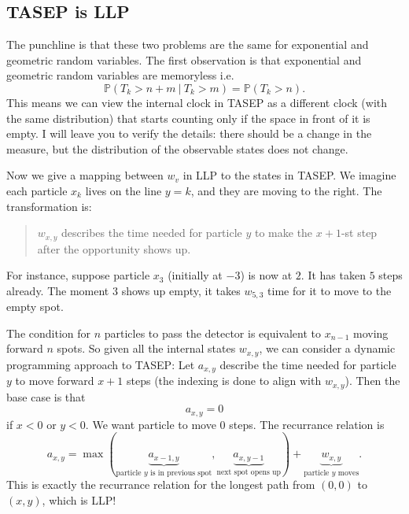 \subsection*{TASEP is LLP}
The punchline is that these two problems are the same for exponential and geometric random variables. The first observation is that exponential and geometric random variables are memoryless i.e. \[
\mathbb{P}(T_k>n+m\ |\ T_k>m) = \mathbb{P}(T_k>n).
\]
This means we can view the internal clock in TASEP as a different clock (with the same distribution) that starts counting only if the space in front of it is empty. I will leave you to verify the details: there should be a change in the measure, but the distribution of the observable states does not change.

Now we give a mapping between $w_v$ in LLP to the states in TASEP. We imagine each particle $x_k$ lives on the line $y=k$, and they are moving to the right. The transformation is: \begin{quote}
    $w_{x,y}$ describes the time needed for particle $y$ to make the $x+1$-st step after the opportunity shows up.
\end{quote}
For instance, suppose particle $x_3$ (initially at $-3$) is now at $2$. It has taken $5$ steps already. The moment $3$ shows up empty, it takes $w_{5,3}$ time for it to move to the empty spot.


The condition for $n$ particles to pass the detector is equivalent to $x_{n-1}$ moving forward $n$ spots. So given all the internal states $w_{x,y}$, we can consider a dynamic programming approach to TASEP: Let $a_{x,y}$ describe the time needed for particle $y$ to move forward $x+1$ steps (the indexing is done to align with $w_{x,y}$). Then the base case is that \[
a_{x,y}=0
\]
if $x<0$ or $y<0$. We want particle to move $0$ steps.
The recurrance relation is
\[
a_{x,y} = \max(\underbrace{a_{x-1,y}}_{\text{particle $y$ is in previous spot}}, \underbrace{a_{x,y-1}}_{\text{next spot opens up}})+\underbrace{w_{x,y}}_{\text{particle $y$ moves}} .
\] 
This is exactly the recurrance relation for the longest path from $(0,0)$ to $(x,y)$, which is LLP!

